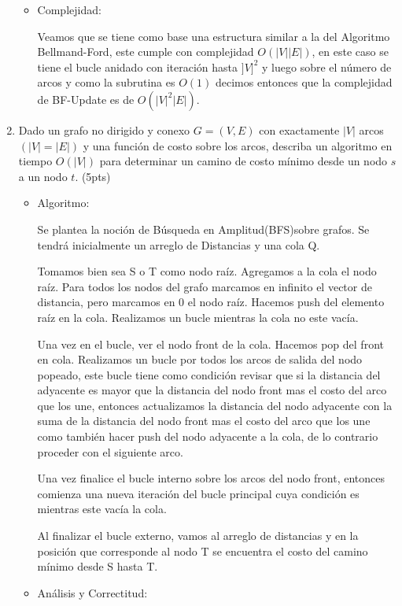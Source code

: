 \documentclass[a4paper,12pt]{article}
\begin{document}
\begin{enumerate}
\begin{itemize}
\item Complejidad:

Veamos que se tiene como base una estructura similar a la del Algoritmo Bellmand-Ford, este cumple con complejidad $O(|V||E|)$, en este caso se tiene el bucle anidado con iteración hasta $]V]^2$ y luego sobre el número de arcos y como la subrutina es $O(1)$ decimos entonces que la complejidad de BF-Update es de $O(|V|^2|E|)$.

\end{itemize}

\item Dado un grafo no dirigido y conexo $G = (V,E)$ con exactamente $|V|$ arcos $(|V| = |E|)$ y una función de costo sobre los arcos, describa un algoritmo en tiempo $O(|V|)$ para determinar un camino de costo mínimo desde un nodo $s$ a un nodo $t$. (5pts)

\begin{itemize}

\item Algoritmo:

Se plantea la noción de Búsqueda en Amplitud(BFS)sobre grafos. Se tendrá inicialmente un arreglo de Distancias y una cola Q.

Tomamos bien sea S o T como nodo raíz. Agregamos a la cola el nodo raíz.
Para todos los nodos del grafo marcamos en infinito el vector de distancia, pero marcamos en 0 el nodo raíz. Hacemos push del elemento raíz en la cola. Realizamos un bucle mientras la cola no este vacía. 

Una vez en el bucle, ver el nodo front de la cola. Hacemos pop del front en cola. Realizamos un bucle por todos los arcos de salida del nodo popeado, este bucle tiene como condición revisar que si la distancia del adyacente es mayor que la distancia del nodo front mas el costo del arco que los une, entonces actualizamos la distancia del nodo adyacente con la suma de la distancia del nodo front mas el costo del arco que los une como también hacer push del nodo adyacente a la cola, de lo contrario proceder con el siguiente arco.

Una vez finalice el bucle interno sobre los arcos del nodo front, entonces comienza una nueva iteración del bucle principal cuya condición es mientras este vacía la cola. 

Al finalizar el bucle externo, vamos al arreglo de distancias y en la posición que corresponde al nodo T se encuentra el costo del camino mínimo desde S hasta T.

\item Análisis y Correctitud:


\end{itemize}
\end{enumerate}
\end{document}
